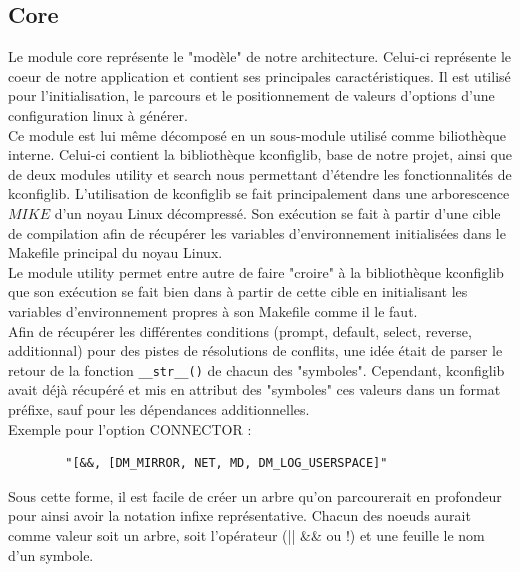 \documentclass[16pts]{report}
\begin{document}
    \subsection{Core}
    \label{sub:Core}
    Le module core représente le "modèle" de notre architecture.
    Celui-ci représente le coeur de notre application et contient
    ses principales caractéristiques.
    Il est utilisé pour l'initialisation, le parcours et le positionnement
    de valeurs d'options d'une configuration linux à générer. \\
    Ce module est lui même décomposé en un sous-module utilisé comme
    biliothèque interne. Celui-ci contient la bibliothèque kconfiglib, base
    de notre projet, ainsi que de deux modules utility et search nous
    permettant d'étendre les fonctionnalités de kconfiglib.
    L'utilisation de kconfiglib se fait principalement dans une arborescence
    $MIKE$ d'un noyau Linux décompressé. Son exécution se fait à partir d'une
    cible de compilation afin de récupérer les variables d'environnement
    initialisées dans le Makefile principal du noyau Linux. \\
    Le module utility permet entre autre de faire "croire" à la bibliothèque
    kconfiglib que son exécution se fait bien dans à partir de cette cible en
    initialisant les variables d'environnement propres à son Makefile comme
    il le faut. \\
    Afin de récupérer les différentes conditions
    (prompt, default, select, reverse, additionnal) pour des pistes
    de résolutions de conflits, une idée était de parser le retour de la
    fonction \verb|__str__()| de chacun des "symboles".
    Cependant, kconfiglib avait déjà récupéré et mis en attribut des "symboles"
    ces valeurs dans un format préfixe, sauf pour les dépendances
    additionnelles.\\
    Exemple pour l'option CONNECTOR :

    \begin{lstlisting}
        "[&&, [DM_MIRROR, NET, MD, DM_LOG_USERSPACE]"
    \end{lstlisting}

    Sous cette forme, il est facile de créer un arbre qu'on parcourerait en
    profondeur pour ainsi avoir la notation infixe représentative.
    Chacun des noeuds aurait comme valeur soit un arbre, soit l'opérateur
    (|| \&\& ou !) et une feuille le nom d'un symbole.\\
\end{document}
